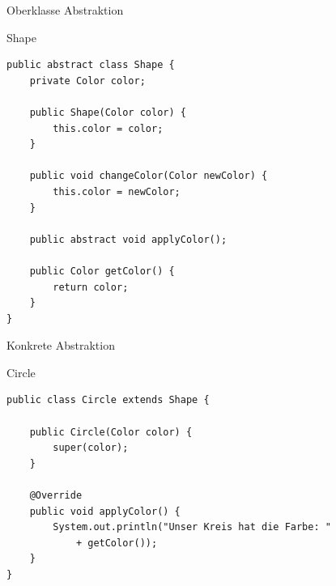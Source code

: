 \begin{frame}[fragile]{Oberklasse Abstraktion}
	\begin{exampleblock}{Shape}
 		\begin{lstlisting}
public abstract class Shape {
	private Color color;
	
	public Shape(Color color) {
		this.color = color;
	}
	
	public void changeColor(Color newColor) {
		this.color = newColor;
	}
	
	public abstract void applyColor();
	
	public Color getColor() {
		return color;
	}
}
 		\end{lstlisting}
 	\end{exampleblock}
\end{frame}

\begin{frame}[fragile]{Konkrete Abstraktion}
	\begin{exampleblock}{Circle}
 		\begin{lstlisting}
public class Circle extends Shape {

	public Circle(Color color) {
		super(color);
	}

	@Override
	public void applyColor() {
		System.out.println("Unser Kreis hat die Farbe: "
            + getColor());		
	}
}
 		\end{lstlisting}
 	\end{exampleblock}
\end{frame}

